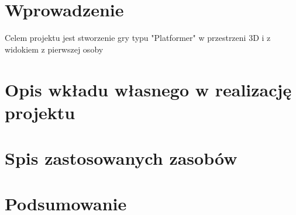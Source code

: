 \documentclass[10pt,a4paper]{article}
\begin{document}
\section{Wprowadzenie} 
\label{sec:wprowadzenie}

Celem projektu jest stworzenie gry typu "Platformer" w przestrzeni 3D i z widokiem z pierwszej
osoby







\section{Opis wkładu własnego w realizację projektu}

\section{Spis zastosowanych zasobów}

\section{Podsumowanie}
\end{document}
